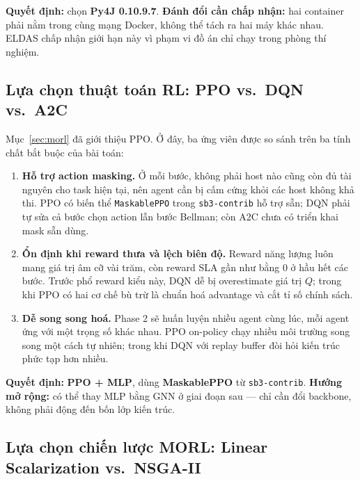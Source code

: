 \textbf{Quyết định:} chọn \textbf{Py4J 0.10.9.7}.
\textbf{Đánh đổi cần chấp nhận:} hai container phải nằm trong cùng
mạng Docker, không thể tách ra hai máy khác nhau. ELDAS chấp nhận
giới hạn này vì phạm vi đồ án chỉ chạy trong phòng thí nghiệm.

\subsection{Lựa chọn thuật toán RL: PPO vs.\ DQN vs.\ A2C}
\label{ssec:choose-rl}

Mục~\ref{sec:morl} đã giới thiệu PPO. Ở đây, ba ứng viên được so sánh
trên ba tính chất bắt buộc của bài toán:
\begin{enumerate}
  \item \textbf{Hỗ trợ action masking.} Ở mỗi bước, không phải host
        nào cũng còn đủ tài nguyên cho task hiện tại, nên agent
        cần bị cấm cứng khỏi các host không khả thi. PPO có biến
        thể \texttt{MaskablePPO} trong \texttt{sb3-contrib} hỗ trợ
        sẵn; DQN phải tự sửa cả bước chọn action lẫn bước Bellman;
        còn A2C chưa có triển khai mask sẵn dùng.
  \item \textbf{Ổn định khi reward thưa và lệch biên độ.} Reward
        năng lượng luôn mang giá trị âm cỡ vài trăm, còn reward
        SLA gần như bằng $0$ ở hầu hết các bước. Trước phổ reward
        kiểu này, DQN dễ bị overestimate giá trị $Q$; trong khi
        PPO có hai cơ chế bù trừ là chuẩn hoá advantage và cắt tỉ
        số chính sách.
  \item \textbf{Dễ song song hoá.} Phase 2 sẽ huấn luyện nhiều
        agent cùng lúc, mỗi agent ứng với một trọng số khác nhau.
        PPO on-policy chạy nhiều môi trường song song một cách tự
        nhiên; trong khi DQN với replay buffer đòi hỏi kiến trúc
        phức tạp hơn nhiều.
\end{enumerate}

\textbf{Quyết định:} \textbf{PPO + MLP}, dùng \textbf{MaskablePPO} từ
\texttt{sb3-contrib}. \textbf{Hướng mở rộng:} có thể thay MLP bằng GNN
ở giai đoạn sau --- chỉ cần đổi backbone, không phải động đến bốn lớp
kiến trúc.

\subsection{Lựa chọn chiến lược MORL: Linear Scalarization vs.\ NSGA-II}
\label{ssec:choose-morl}

